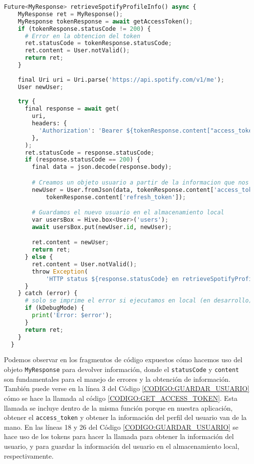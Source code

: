 \begin{lstlisting}[language=python, caption=Guardar información del usuario, label=CODIGO:GUARDAR_USUARIO]
  Future<MyResponse> retrieveSpotifyProfileInfo() async {
    MyResponse ret = MyResponse();
    MyResponse tokenResponse = await getAccessToken();
    if (tokenResponse.statusCode != 200) {
      # Error en la obtencion del token
      ret.statusCode = tokenResponse.statusCode;
      ret.content = User.notValid();
      return ret;
    }
  
    final Uri uri = Uri.parse('https://api.spotify.com/v1/me');
    User newUser;
  
    try {
      final response = await get(
        uri,
        headers: {
          'Authorization': 'Bearer ${tokenResponse.content["access_token"]}'
        },
      );
      ret.statusCode = response.statusCode;
      if (response.statusCode == 200) {
        final data = json.decode(response.body);

        # Creamos un objeto usuario a partir de la informacion que nos devuelve Spotify 
        newUser = User.fromJson(data, tokenResponse.content['access_token'],
            tokenResponse.content['refresh_token']);

        # Guardamos el nuevo usuario en el almacenamiento local
        var usersBox = Hive.box<User>('users');
        await usersBox.put(newUser.id, newUser);

        ret.content = newUser;
        return ret;
      } else {
        ret.content = User.notValid();
        throw Exception(
            'HTTP status ${response.statusCode} en retrieveSpotifyProfileInfo');
      }
    } catch (error) {
      # solo se imprime el error si ejecutamos en local (en desarrollo)
      if (kDebugMode) {
        print('Error: $error');
      }
      return ret;
    }
  }
\end{lstlisting}

Podemos observar en los fragmentos de código expuestos cómo hacemos uso del objeto \texttt{MyResponse} para devolver información, donde el \texttt{statusCode}
y \texttt{content} son fundamentales para el manejo de errores y la obtención de información. También puede verse en la línea 3 del Código \ref{CODIGO:GUARDAR_USUARIO}
cómo se hace la llamada al código \ref{CODIGO:GET_ACCESS_TOKEN}. Esta llamada se incluye dentro de la misma función porque en nuestra aplicación, obtener el 
\texttt{access\_token} y obtener la información del perfil del usuario van de la mano. En las líneas 18 y 26 del Código \ref{CODIGO:GUARDAR_USUARIO} se hace uso 
de los tokens para hacer la llamada para obtener la información del usuario, y para guardar la información del usuario en el almacenamiento local, respectivamente.

